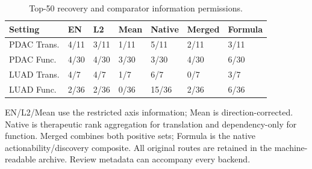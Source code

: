 \begin{table}[!tbp]
\centering\small
\caption{Top-50 recovery and comparator information permissions.}\label{tab:comparator-results}
\begin{tabularx}{\textwidth}{p{}YYYYYY}\toprule
Setting & EN & L2 & Mean & Native & Merged & Formula \\ \midrule
PDAC Trans. & 4/11 & 3/11 & 1/11 & 5/11 & 2/11 & 3/11 \\
PDAC Func. & 4/30 & 4/30 & 3/30 & 3/30 & 4/30 & 6/30 \\
LUAD Trans. & 4/7 & 4/7 & 1/7 & 6/7 & 0/7 & 3/7 \\
LUAD Func. & 2/36 & 2/36 & 0/36 & 15/36 & 2/36 & 6/36 \\
\bottomrule\end{tabularx}
\parbox{\textwidth}{\footnotesize EN/L2/Mean use the restricted axis information; Mean is direction-corrected. Native is therapeutic rank aggregation for translation and dependency-only for function. Merged combines both positive sets; Formula is the native actionability/discovery composite. All original routes are retained in the machine-readable archive. Review metadata can accompany every backend.}
\end{table}
